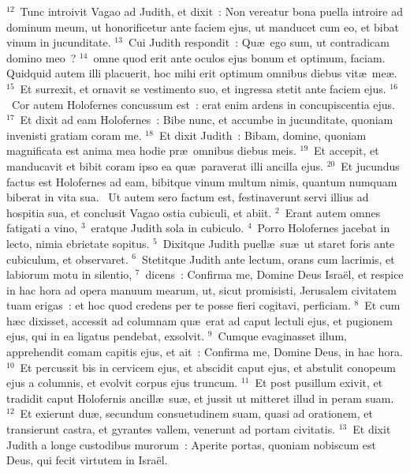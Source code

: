 ${}^{12}$~Tunc introivit Vagao ad Judith, et dixit~: Non vereatur bona puella introire ad dominum meum, ut honorificetur ante faciem ejus, ut manducet cum eo, et bibat vinum in jucunditate.
${}^{13}$~Cui Judith respondit~: Qu\ae\ ego sum, ut contradicam domino meo~?
${}^{14}$~omne quod erit ante oculos ejus bonum et optimum, faciam. Quidquid autem illi placuerit, hoc mihi erit optimum omnibus diebus vit\ae\ me\ae .
${}^{15}$~Et surrexit, et ornavit se vestimento suo, et ingressa stetit ante faciem ejus.
${}^{16}$~Cor autem Holofernes concussum est~: erat enim ardens in concupiscentia ejus.
${}^{17}$~Et dixit ad eam Holofernes~: Bibe nunc, et accumbe in jucunditate, quoniam invenisti gratiam coram me.
${}^{18}$~Et dixit Judith~: Bibam, domine, quoniam magnificata est anima mea hodie pr\ae\ omnibus diebus meis.
${}^{19}$~Et accepit, et manducavit et bibit coram ipso ea qu\ae\ paraverat illi ancilla ejus.
${}^{20}$~Et jucundus factus est Holofernes ad eam, bibitque vinum multum nimis, quantum numquam biberat in vita sua.
~Ut autem sero factum est, festinaverunt servi illius ad hospitia sua, et conclusit Vagao ostia cubiculi, et abiit.
${}^{2}$~Erant autem omnes fatigati a vino,
${}^{3}$~eratque Judith sola in cubiculo.
${}^{4}$~Porro Holofernes jacebat in lecto, nimia ebrietate sopitus.
${}^{5}$~Dixitque Judith puell\ae\ su\ae\ ut staret foris ante cubiculum, et observaret.
${}^{6}$~Stetitque Judith ante lectum, orans cum lacrimis, et labiorum motu in silentio,
${}^{7}$~dicens~: Confirma me, Domine Deus Isra\"el, et respice in hac hora ad opera manuum mearum, ut, sicut promisisti, Jerusalem civitatem tuam erigas~: et hoc quod credens per te posse fieri cogitavi, perficiam.
${}^{8}$~Et cum h\ae c dixisset, accessit ad columnam qu\ae\ erat ad caput lectuli ejus, et pugionem ejus, qui in ea ligatus pendebat, exsolvit.
${}^{9}$~Cumque evaginasset illum, apprehendit comam capitis ejus, et ait~: Confirma me, Domine Deus, in hac hora.
${}^{10}$~Et percussit bis in cervicem ejus, et abscidit caput ejus, et abstulit conopeum ejus a columnis, et evolvit corpus ejus truncum.
${}^{11}$~Et post pusillum exivit, et tradidit caput Holofernis ancill\ae\ su\ae , et jussit ut mitteret illud in peram suam.
${}^{12}$~Et exierunt du\ae , secundum consuetudinem suam, quasi ad orationem, et transierunt castra, et gyrantes vallem, venerunt ad portam civitatis.
${}^{13}$~Et dixit Judith a longe custodibus murorum~: Aperite portas, quoniam nobiscum est Deus, qui fecit virtutem in Isra\"el.


